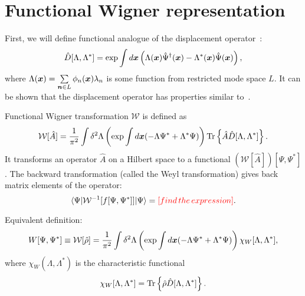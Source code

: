 \section{Functional Wigner representation}

First, we will define functional analogue of the displacement operator~:
\[
	\hat{D}[\Lambda, \Lambda^*] = \exp \int d\boldsymbol{x} \left(
		\Lambda(\boldsymbol{x}) \hat{\Psi}^\dagger(\boldsymbol{x}) - \Lambda^*(\boldsymbol{x}) \hat{\Psi}(\boldsymbol{x})
	\right),
\]
where $\Lambda(\boldsymbol{x}) = \sum\limits_{\boldsymbol{n} \in L} \phi_n(\boldsymbol{x}) \lambda_n$ is some function from restricted mode space $L$.
It can be shown that the displacement operator has properties similar to~.

Functional Wigner transformation $\mathcal{W}$ is defined as
\begin{equation}
\label{eqn:formalism:func-wigner:w-transformation}
	\mathcal{W}[\hat{A}]
	= \frac{1}{\pi^2} \int \delta^2 \Lambda \left(
		\exp \int d\boldsymbol{x} (-\Lambda \Psi^* + \Lambda^* \Psi)
	\right)
	\mathrm{Tr} \left\{  \hat{A} \hat{D}[\Lambda, \Lambda^*]  \right\}.
\end{equation}
It transforms an operator $\hat{A}$ on a Hilbert space to a functional $(\mathcal{W}[\hat{A}])[\Psi, \Psi^*]$.
The backward transformation (called the Weyl transformation) gives back matrix elements of the operator:
\[
	\langle \Psi \lvert \mathcal{W}^{-1}[f[\Psi, \Psi^*]] \rvert \Psi \rangle
	= \textcolor{red}{[find\,the\,expression]}.
\]

Equivalent definition:
\begin{equation}
\label{eqn:formalism:func-wigner:w-function}
	W [\Psi, \Psi^*]
	\equiv \mathcal{W}[\hat{\rho}]
	= \frac{1}{\pi^2} \int \delta^2 \Lambda \left(
		\exp \int d\boldsymbol{x} (-\Lambda \Psi^* + \Lambda^* \Psi)
	\right)
	\chi_W [\Lambda, \Lambda^*],
\end{equation}
where $\chi_W (\Lambda, \Lambda^*)$ is the characteristic functional
\[
	\chi_W [\Lambda, \Lambda^*]
	= \mathrm{Tr} \left\{  \hat{\rho} \hat{D}[\Lambda, \Lambda^*]  \right\}.
\]

